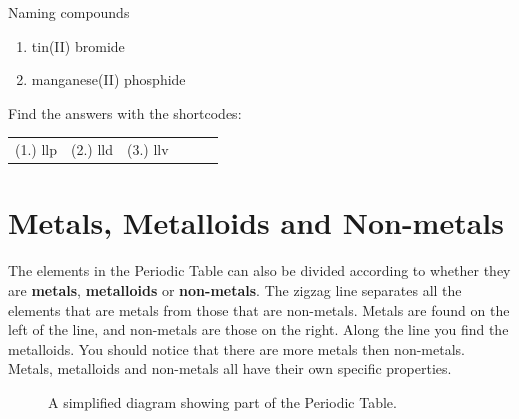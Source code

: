 \begin{exercises}{Naming compounds}
{\begin{enumerate}[noitemsep, label=\textbf{\arabic*}. ]
\begin{enumerate}[noitemsep, label=\textbf{\alph*}. ]
\item tin(II) bromide
\item manganese(II) phosphide
\end{enumerate}
\end{enumerate}
    \label{m38708*cid5}
\par {} Find the answers with the shortcodes:
 \par \begin{tabular}[h]{cccccc}
 (1.) llp  &  (2.) lld  &  (3.) llv   & & \end{tabular}}
\end{exercises}
            \section{Metals, Metalloids and Non-metals}
            \nopagebreak
      \label{m38708*id65693}The elements in the Periodic Table can also be divided according to whether they are \textbf{metals}, \textbf{metalloids} or \textbf{non-metals}. The zigzag line separates all the elements that are metals from those that are non-metals. Metals are found on the left of the line, and non-metals are those on the right. Along the line you find the metalloids. You should notice that there are more metals then non-metals. Metals, metalloids and non-metals all have their own specific properties.\par 
\begin{figure}[h]

\begin{center}
\end{center}
\caption{A simplified diagram showing part of the Periodic Table.}
\label{fig:periodic}
\end{figure} \vspace{-.5cm}
      \label{m38708*uid76}
